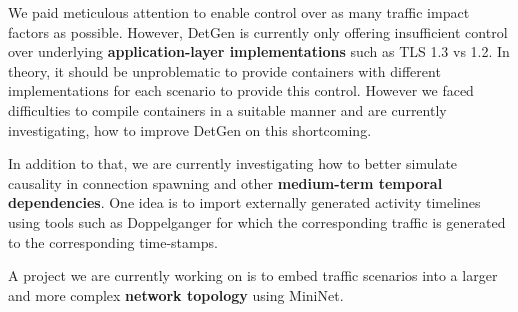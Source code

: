 \documentclass[runningheads]{llncs}
\begin{document}




We paid meticulous attention to enable control over as many traffic impact factors as possible. However, DetGen is currently only offering insufficient control over underlying \textbf{application-layer implementations} such as TLS 1.3 vs 1.2. In theory, it should be unproblematic to provide containers with different implementations for each scenario to provide this control. However we faced difficulties to compile containers in a suitable manner and are currently investigating, how to improve DetGen on this shortcoming.

In addition to that, we are currently investigating how to better simulate causality in connection spawning and other \textbf{medium-term temporal dependencies}. One idea is to import externally generated activity timelines using tools such as Doppelganger \cite{lin2019generating} for which the corresponding traffic is generated to the corresponding time-stamps. 

A project we are currently working on is to embed traffic scenarios into a larger and more complex \textbf{network topology} using MiniNet.


\end{document}
